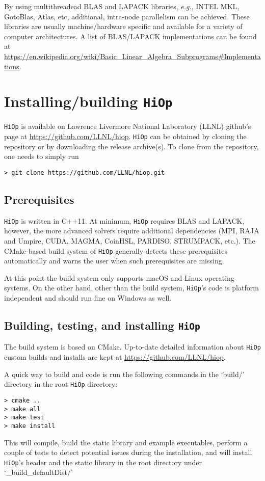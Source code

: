 \documentclass[11pt]{article}
\newcommand{\Hi}{\texttt{HiOp}\xspace}
\begin{document}
By using multithreadead BLAS and LAPACK libraries, \textit{e.g.}, INTEL MKL, GotoBlas, Atlas, etc, additional,  intra-node parallelism can be achieved. These libraries are usually  machine/hardware specific and available for a variety of computer architectures. A list of BLAS/LAPACK implementations can be found at 
\url{https://en.wikipedia.org/wiki/Basic_Linear_Algebra_Subprograms\#Implementations}. 

\section{Installing/building \Hi}
\Hi is available on  Lawrence Livermore National Laboratory (LLNL)  github's page at 
\url{https://github.com/LLNL/hiop}. \Hi can be obtained by cloning the repository or by downloading the release archive(s). To clone from the repository, one needs to simply run
\begin{verbatim}
> git clone https://github.com/LLNL/hiop.git
\end{verbatim}

\subsection{Prerequisites} 
\Hi is written in C++11. At minimum, \Hi  requires BLAS and LAPACK, however, the more advanced solvers require additional dependencies (MPI, RAJA and Umpire, CUDA, MAGMA, CoinHSL, PARDISO, STRUMPACK, etc.). The CMake-based build system of \Hi generally detects these prerequisites automatically and warns the user when such prerequisites are missing.

At this point the build system only supports macOS and Linux operating systems. On the other hand, other than the build system, \Hi's code is  platform independent and should run fine on Windows as well.


\subsection{Building, testing, and installing \Hi}
The build system is based on CMake. Up-to-date detailed information about \Hi custom builds and installs are kept at \url{https://github.com/LLNL/hiop}. 

A quick way to build and code is run the following commands in the `build\//' directory in the root \Hi directory: 
\begin{verbatim}
> cmake ..
> make all
> make test
> make install
\end{verbatim}
This will compile, build the static library and example executables, perform a couple of tests to detect potential issues during the installation, and will install \Hi's header and the static library in the root directory under `\_build\_defaultDist\//'
\end{document}
